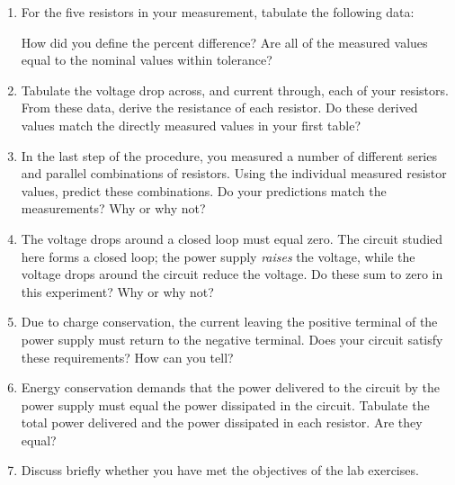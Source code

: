 \documentclass[12pt]{article}
\begin{document}
\begin{enumerate}
\item For the five resistors in your measurement, tabulate the
  following data:
  How did you define the percent difference? Are all of the measured
  values equal to the nominal values within tolerance?
\item Tabulate the voltage drop across, and current through, each of
  your resistors.  From these data, derive the resistance of each
  resistor.  Do these derived values match the directly measured
  values in your first table?
\item In the last step of the procedure, you measured a number of
  different series and parallel combinations of resistors.  Using the
  individual measured resistor values, predict these combinations.  Do
  your predictions match the measurements?  Why or why not?
\item The voltage drops around a closed loop must equal zero.  The
  circuit studied here forms a closed loop; the power supply
  \textit{raises} the voltage, while the voltage drops around the
  circuit reduce the voltage.  Do these sum to zero in this
  experiment?  Why or why not?
\item Due to charge conservation, the current leaving the positive
  terminal of the power supply must return to the negative terminal.
  Does your circuit satisfy these requirements?  How can you tell?
\item Energy conservation demands that the power delivered to the
  circuit by the power supply must equal the power dissipated in the
  circuit.  Tabulate the total power delivered and the power
  dissipated in each resistor.  Are they equal?
\item Discuss briefly whether you have met the objectives of the lab
  exercises.
\end{enumerate}
\end{document}
